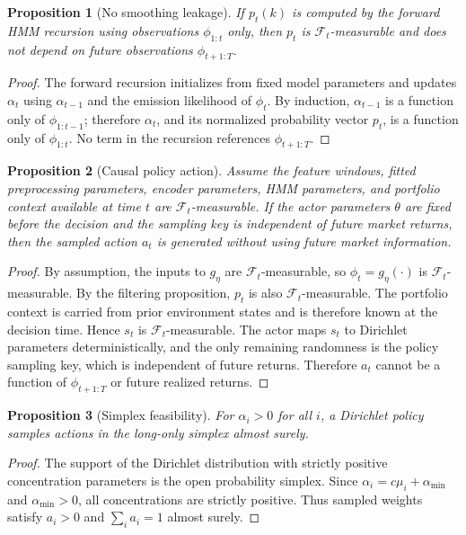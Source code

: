\documentclass[11pt]{article}
\newtheorem{proposition}{Proposition}
\newcommand{\1}{\mathbf{1}}
\begin{document}
\begin{proposition}[No smoothing leakage]
If $p_t(k)$ is computed by the forward HMM recursion using observations
$\phi_{1:t}$ only, then $p_t$ is $\mathcal{F}_t$-measurable and does not depend
on future observations $\phi_{t+1:T}$.
\end{proposition}

\begin{proof}
The forward recursion initializes from fixed model parameters and updates
$\alpha_t$ using $\alpha_{t-1}$ and the emission likelihood of $\phi_t$. By
induction, $\alpha_{t-1}$ is a function only of $\phi_{1:t-1}$; therefore
$\alpha_t$, and its normalized probability vector $p_t$, is a function only of
$\phi_{1:t}$. No term in the recursion references $\phi_{t+1:T}$.
\end{proof}

\begin{proposition}[Causal policy action]
Assume the feature windows, fitted preprocessing parameters, encoder
parameters, HMM parameters, and portfolio context available at time $t$ are
$\mathcal{F}_t$-measurable. If the actor parameters $\theta$ are fixed before
the decision and the sampling key is independent of future market returns, then
the sampled action $a_t$ is generated without using future market information.
\end{proposition}

\begin{proof}
By assumption, the inputs to $g_\eta$ are $\mathcal{F}_t$-measurable, so
$\phi_t=g_\eta(\cdot)$ is $\mathcal{F}_t$-measurable. By the filtering
proposition, $p_t$ is also $\mathcal{F}_t$-measurable. The portfolio context is
carried from prior environment states and is therefore known at the decision
time. Hence $s_t$ is $\mathcal{F}_t$-measurable. The actor maps $s_t$ to
Dirichlet parameters deterministically, and the only remaining randomness is
the policy sampling key, which is independent of future returns. Therefore
$a_t$ cannot be a function of $\phi_{t+1:T}$ or future realized returns.
\end{proof}

\begin{proposition}[Simplex feasibility]
For $\alpha_i>0$ for all $i$, a Dirichlet policy samples actions in the
long-only simplex almost surely.
\end{proposition}

\begin{proof}
The support of the Dirichlet distribution with strictly positive concentration
parameters is the open probability simplex. Since
$\alpha_i=c\mu_i+\alpha_{\min}$ and $\alpha_{\min}>0$, all concentrations are
strictly positive. Thus sampled weights satisfy $a_i>0$ and $\sum_i a_i=1$
almost surely.
\end{proof}
\end{document}
